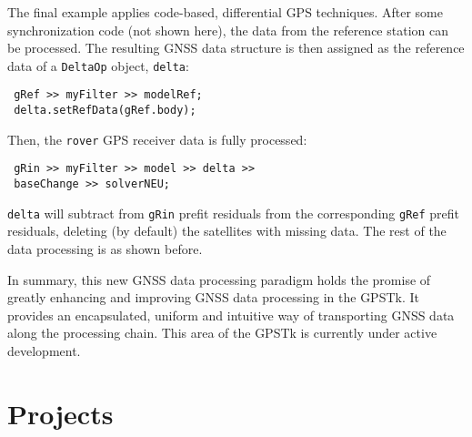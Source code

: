 \documentclass[letterpaper,ugly,10pt]{ion-gps}
\newcommand{\gpstkclass}[1]{\texttt{\mbox{#1}}}
\begin{document}
The final example applies code-based, differential GPS techniques. After some synchronization code (not shown here), the data from the reference station can be processed. The resulting GNSS data structure is then assigned as the reference data of a \gpstkclass{DeltaOp} object, \gpstkclass{delta}:

\begin{scriptsize}
\begin{lstlisting}
 gRef >> myFilter >> modelRef;
 delta.setRefData(gRef.body);
\end{lstlisting}
\end{scriptsize}

Then, the \gpstkclass{rover} GPS receiver data is fully processed:

\begin{scriptsize}
\begin{lstlisting}
 gRin >> myFilter >> model >> delta >> 
 baseChange >> solverNEU;
\end{lstlisting}
\end{scriptsize}

\gpstkclass{delta} will subtract from \gpstkclass{gRin} prefit residuals from the corresponding \gpstkclass{gRef} prefit residuals, deleting (by default) the satellites with missing data. The rest of the data processing is as shown before.

In summary, this new GNSS data processing paradigm holds the promise of greatly enhancing and improving GNSS data processing in the GPSTk. It provides an encapsulated, uniform and intuitive way of transporting GNSS data along the processing chain. This area of the GPSTk is currently under active development.


\section*{Projects}
\end{document}
